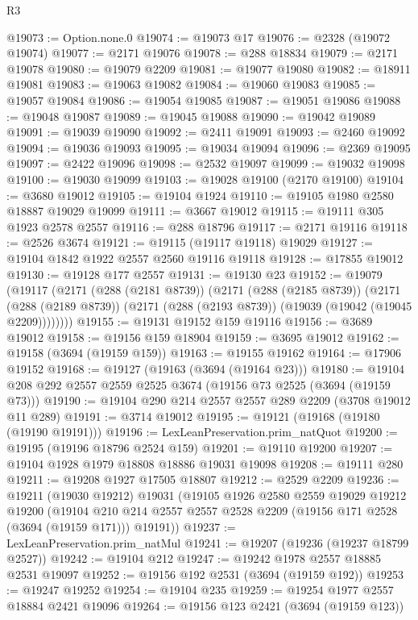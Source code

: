 \begin{lexlean}{R3}
\begin{coremodule}
@19073 := Option.none.{0}
@19074 := @19073 @17
@19076 := @2328 (@19072 @19074)
@19077 := @2171 @19076
@19078 := @288 @18834
@19079 := @2171 @19078
@19080 := @19079 @2209
@19081 := @19077 @19080
@19082 := @18911 @19081
@19083 := @19063 @19082
@19084 := @19060 @19083
@19085 := @19057 @19084
@19086 := @19054 @19085
@19087 := @19051 @19086
@19088 := @19048 @19087
@19089 := @19045 @19088
@19090 := @19042 @19089
@19091 := @19039 @19090
@19092 := @2411 @19091
@19093 := @2460 @19092
@19094 := @19036 @19093
@19095 := @19034 @19094
@19096 := @2369 @19095
@19097 := @2422 @19096
@19098 := @2532 @19097
@19099 := @19032 @19098
@19100 := @19030 @19099
@19103 := @19028 @19100 (@2170 @19100)
@19104 := @3680 @19012
@19105 := @19104 @1924
@19110 := @19105 @1980 @2580 @18887 @19029 @19099
@19111 := @3667 @19012
@19115 := @19111 @305 @1923 @2578 @2557
@19116 := @288 @18796
@19117 := @2171 @19116
@19118 := @2526 @3674
@19121 := @19115 (@19117 @19118) @19029
@19127 := @19104 @1842 @1922 @2557 @2560 @19116 @19118
@19128 := @17855 @19012
@19130 := @19128 @177 @2557
@19131 := @19130 @23
@19152 := @19079
    (@19117
      (@2171
        (@288 (@2181 @8739))
        (@2171
          (@288 (@2185 @8739))
          (@2171
            (@288 (@2189 @8739))
            (@2171 (@288 (@2193 @8739)) (@19039 (@19042 (@19045 @2209))))))))
@19155 := @19131 @19152 @159 @19116
@19156 := @3689 @19012
@19158 := @19156 @159 @18904
@19159 := @3695 @19012
@19162 := @19158 (@3694 (@19159 @159))
@19163 := @19155 @19162
@19164 := @17906 @19152
@19168 := @19127 (@19163 (@3694 (@19164 @23)))
@19180 := @19104 @208 @292 @2557 @2559 @2525 @3674 (@19156 @73 @2525 (@3694 (@19159 @73)))
@19190 := @19104 @290 @214 @2557 @2557 @289 @2209 (@3708 @19012 @11 @289)
@19191 := @3714 @19012
@19195 := @19121 (@19168 (@19180 (@19190 @19191)))
@19196 := LexLeanPreservation.prim_natQuot
@19200 := @19195 (@19196 @18796 @2524 @159)
@19201 := @19110 @19200
@19207 := @19104 @1928 @1979 @18808 @18886 @19031 @19098
@19208 := @19111 @280
@19211 := @19208 @1927 @17505 @18807
@19212 := @2529 @2209
@19236 := @19211
    (@19030 @19212)
    @19031
    (@19105
      @1926
      @2580
      @2559
      @19029
      @19212
      @19200
      (@19104 @210 @214 @2557 @2557 @2528 @2209 (@19156 @171 @2528 (@3694 (@19159 @171))) @19191))
@19237 := LexLeanPreservation.prim_natMul
@19241 := @19207 (@19236 (@19237 @18799 @2527))
@19242 := @19104 @212
@19247 := @19242 @1978 @2557 @18885 @2531 @19097
@19252 := @19156 @192 @2531 (@3694 (@19159 @192))
@19253 := @19247 @19252
@19254 := @19104 @235
@19259 := @19254 @1977 @2557 @18884 @2421 @19096
@19264 := @19156 @123 @2421 (@3694 (@19159 @123))

\end{coremodule}
\end{lexlean}
